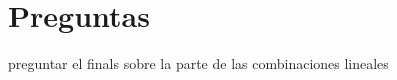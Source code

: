 \documentclass[10pt,a4paper]{article} %
\begin{document}
            \section{Preguntas}
                preguntar el finals sobre la parte de las combinaciones lineales
            







    
    \nocite{*}
    
    
\end{document}
